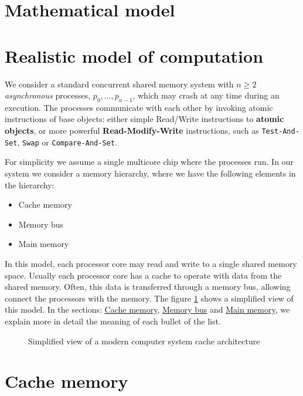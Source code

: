 \documentclass[openany, a4paper]{book}
\theoremstyle{break}
\theoremstyle{example}
\theoremstyle{note}
\theoremstyle{break}
\theoremstyle{exercise}
\begin{document}
\section{Mathematical model}
\label{sec:org1523276}


\section{Realistic model of computation}
\label{sec:org91e4488}

We consider a standard concurrent shared memory system with \(n \ge 2\)
\emph{asynchronous} processes, \(p_0, \ldots, p_{n-1}\), which may crash at any time
during an execution. The processes communicate with each other by invoking
atomic instructions of base objects: either simple Read/Write instructions to
\textbf{atomic objects}, or more powerful \textbf{Read-Modify-Write} instructions, such as
\texttt{Test-And-Set}, \texttt{Swap} or \texttt{Compare-And-Set}.

For simplicity we assume a single multicore chip where the processes run. In
our system we consider a memory hierarchy, where we have the following
elements in the hierarchy:

\begin{itemize}
\item Cache memory
\item Memory bus
\item Main memory
\end{itemize}

In this model, each processor core may read and
write to a single shared memory space. Usually each processor core has a
cache to operate with data from the shared memory. Often, this data is
transferred through a memory bus, allowing connect the processors with the
memory. The figure \ref{fig:arch} shows a simplified view of this model. In
the sections: \hyperref[sec:org7024893]{Cache memory}, \hyperref[sec:orgb345c60]{Memory bus} and \hyperref[sec:org81a6414]{Main memory}, we explain more in
detail the meaning of each bullet of the list.

\begin{figure}
\begin{minipage}{\linewidth}
  
\end{minipage}
\caption{Simplified view of a modern computer system cache architecture}
\label{fig:arch}
\end{figure}


\section{Cache memory}
\label{sec:org7024893}
\end{document}
